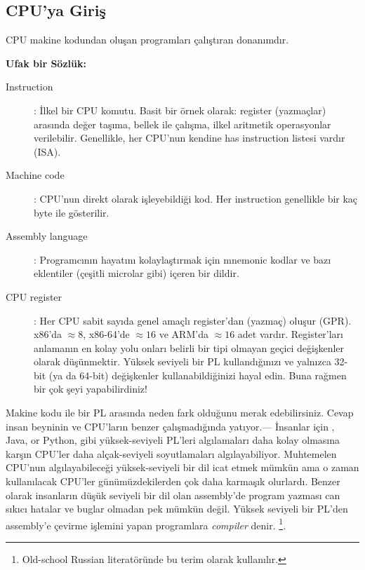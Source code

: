 \subsection{CPU'ya Giriş}

\ac{CPU} makine kodundan oluşan programları çalıştıran donanımdır. 

\textbf{Ufak bir Sözlük:}

\begin{description}
\item[Instruction]: İlkel bir \ac{CPU} komutu.
Basit bir örnek olarak: register (yazmaçlar) arasında değer taşıma, bellek ile çalışma, ilkel aritmetik operasyonlar verilebilir.
Genellikle, her \ac{CPU}'nun kendine has instruction listesi vardır (\ac{ISA}).

\item[Machine code]: \ac{CPU}'nun direkt olarak işleyebildiği kod.
Her instruction genellikle bir kaç byte ile gösterilir.
\item[Assembly language]: Programcının hayatını kolaylaştırmak için mnemonic kodlar ve bazı eklentiler (çeşitli microlar gibi) içeren bir dildir.
\item[CPU register]: Her \ac{CPU} sabit sayıda genel amaçlı register'dan (yazmaç) oluşur (\ac{GPR}).
x86'da $\approx 8$, x86-64'de $\approx 16$ ve ARM'da $\approx 16$ adet vardır.
Register'ları anlamanın en kolay yolu onları belirli bir tipi olmayan geçici değişkenler olarak düşünmektir.
Yüksek seviyeli bir \ac{PL} kullandığınızı ve yalnızca 32-bit (ya da 64-bit) değişkenler kullanabildiğinizi hayal edin.
Buna rağmen bir çok şeyi yapabilirdiniz!
\end{description}


Makine kodu ile bir \ac{PL} arasında neden fark olduğunu merak edebilirsiniz. Cevap insan beyninin ve \ac{CPU}'ların benzer çalışmadığında yatıyor.---%
İnsanlar için \CCpp, Java, or Python, gibi yüksek-seviyeli \ac{PL}'leri algılamaları daha kolay olmasına karşın \ac{CPU}'ler daha alçak-seviyeli soyutlamaları algılayabiliyor.
Muhtemelen \ac{CPU}'nun algılayabileceği yüksek-seviyeli bir dil icat etmek mümkün ama o zaman kullanılacak \ac{CPU}'ler günümüzdekilerden çok daha karmaşık olurlardı. 
Benzer olarak insanların düşük seviyeli bir dil olan assembly'de program yazması can sıkıcı hatalar ve buglar olmadan pek mümkün değil.
Yüksek seviyeli bir \ac{PL}'den assembly'e çevirme işlemini yapan programlara  \emph{compiler} denir.
\footnote{Old-school Russian literatöründe bu terim  olarak kullanılır.}.


